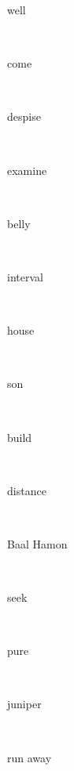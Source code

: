 \documentclass[a4paper]{article}
\begin{document}
\begin{multicols}{4}
\begin{multicols}{4}
\begin{multicols}{5}
{\hebrewfont{}} \begin{english}well\end{english}\\
{\hebrewfont{}} \begin{english}come\end{english}\\
{\hebrewfont{}} \begin{english}despise\end{english}\\
{\hebrewfont{}} \begin{english}examine\end{english}\\
{\hebrewfont{}} \begin{english}belly\end{english}\\
{\hebrewfont{}} \begin{english}interval\end{english}\\
{\hebrewfont{}} \begin{english}house\end{english}\\
{\hebrewfont{}} \begin{english}son\end{english}\\
{\hebrewfont{}} \begin{english}build\end{english}\\
{\hebrewfont{}} \begin{english}distance\end{english}\\
{\hebrewfont{}} \begin{english}Baal Hamon\end{english}\\
{\hebrewfont{}} \begin{english}seek\end{english}\\
{\hebrewfont{}} \begin{english}pure\end{english}\\
{\hebrewfont{}} \begin{english}juniper\end{english}\\
{\hebrewfont{}} \begin{english}run away\end{english}\\

\end{multicols}
\end{multicols}
\end{multicols}
\end{document}
